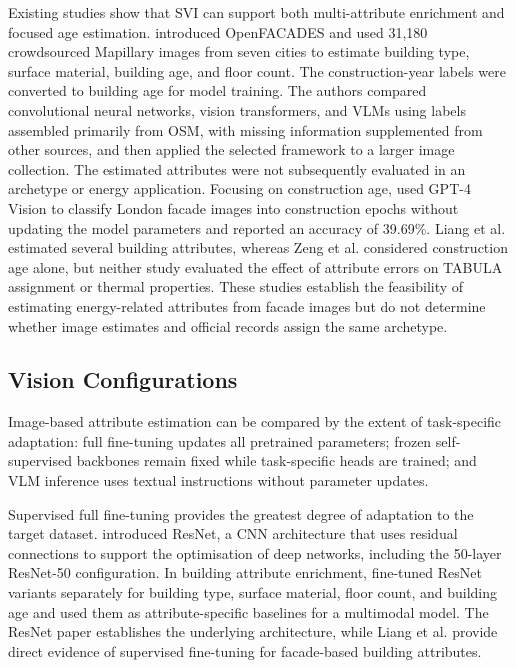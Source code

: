 Existing studies show that \ac{SVI} can support both multi-attribute enrichment and focused age estimation. \textcite{liang2025} introduced OpenFACADES and used 31,180 crowdsourced Mapillary images from seven cities to estimate building type, surface material, building age, and floor count. The construction-year labels were converted to building age for model training. The authors compared convolutional neural networks, vision transformers, and \acp{VLM} using labels assembled primarily from \ac{OSM}, with missing information supplemented from other sources, and then applied the selected framework to a larger image collection. The estimated attributes were not subsequently evaluated in an archetype or energy application. Focusing on construction age, \textcite{zeng2024} used GPT-4 Vision to classify London facade images into construction epochs without updating the model parameters and reported an accuracy of 39.69\%. Liang et al. estimated several building attributes, whereas Zeng et al. considered construction age alone, but neither study evaluated the effect of attribute errors on TABULA assignment or thermal properties. These studies establish the feasibility of estimating energy-related attributes from facade images but do not determine whether image estimates and official records assign the same archetype.

\subsection{Vision Configurations}
\label{sec:image_model_configurations}

Image-based attribute estimation can be compared by the extent of task-specific adaptation: full fine-tuning updates all pretrained parameters; frozen self-supervised backbones remain fixed while task-specific heads are trained; and \ac{VLM} inference uses textual instructions without parameter updates.

Supervised full fine-tuning provides the greatest degree of adaptation to the target dataset. \textcite{he2016} introduced ResNet, a \acf{CNN} architecture that uses residual connections to support the optimisation of deep networks, including the 50-layer ResNet-50 configuration. In building attribute enrichment, \textcite{liang2025} fine-tuned ResNet variants separately for building type, surface material, floor count, and building age and used them as attribute-specific baselines for a multimodal model. The ResNet paper establishes the underlying architecture, while Liang et al. provide direct evidence of supervised fine-tuning for facade-based building attributes.

